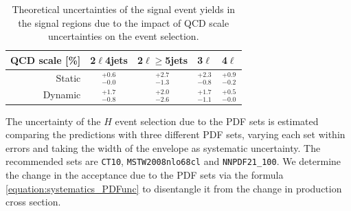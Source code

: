 \begin{table}
\caption{Theoretical uncertainties of the signal event yields in the signal regions due to the impact of QCD scale uncertainties on the event selection.}
\begin{center} 
\begin{tabular}{r|c|c|c|c|}
QCD scale [\%] & 2$\ell$4jets & 2$\ell$$\geq$5jets & 3$\ell$ & 4$\ell$ \\
\hline
Static   & $^{+0.6}_{-0.0}$ & $^{+2.7}_{-1.3}$ & $^{+2.3}_{-0.8}$ & $^{+0.9}_{-0.2}$ \\
Dynamic  & $^{+1.7}_{-0.8}$ & $^{+2.0}_{-2.6}$ & $^{+1.7}_{-1.1}$ & $^{+0.5}_{-0.0}$ \\
\hline
\end{tabular}
\end{center}
\label{table:systematics_theosystttH}
\end{table}%

The uncertainty of the \ttbar$H$ event selection due to the PDF sets is estimated comparing the predictions with three different PDF sets, varying each set within errors and taking the width of the envelope as systematic uncertainty. The recommended sets are \verb+CT10+, \verb+MSTW2008nlo68cl+ and \verb+NNPDF21_100+. 
We determine the change in the acceptance due to the PDF sets via the formula \ref{equation:systematics_PDFunc} to disentangle it from the change in production cross section.

